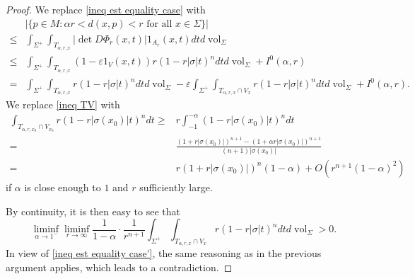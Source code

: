 \documentclass[11pt, reqno]{amsart}
\numberwithin{equation}{section}
\begin{document}
\begin{proof}
We replace \eqref{ineq est equality case} with
\begin{equation}\label{ineq est equality case'}
\begin{aligned}
& | \{p \in M: \alpha r<d(x, p)<r \text { for all } x \in \Sigma\} | \\
\le & \int_{\Sigma^{+}} \int_{T_{\alpha, r, x}} \left|\det D \Phi_r(x, t)\right| 1_{A_r}(x, t) d t d \operatorname{vol}_{\Sigma} \\
\le & \int_{\Sigma^{+}} \int_{T_{\alpha, r, x}} \left(1-\varepsilon 1_V(x, t)\right) r(1-r|\sigma| t)^n d t d \operatorname{vol}_{\Sigma}+I^0(\alpha, r)\\
=& \int_{\Sigma^{+}} \int_{T_{\alpha, r, x}} r(1-r|\sigma| t)^n d t d \operatorname{vol}_{\Sigma}
-\varepsilon\int_{\Sigma^{+}} \int_{T_{\alpha, r, x}\cap V_x} r(1-r|\sigma| t)^n d t d \operatorname{vol}_{\Sigma}
+I^0(\alpha, r).
\end{aligned}
\end{equation}
We replace \eqref{ineq TV} with
\begin{equation*}
\begin{aligned}
\int_{T_{\alpha, r, x_0 }\cap V_{x_0}}r \left(1-r\left|\sigma\left(x_0\right)\right| t\right)^n d t
\ge& r \int_{-1}^{-\alpha}\left(1-r\left|\sigma\left(x_0\right)\right| t\right)^n d t\\
=& \frac{\left(1+r\left|\sigma\left(x_0\right)\right|\right)^{n+1}-\left(1+\alpha r\left|\sigma\left(x_0\right)\right|\right)^{n+1}}{(n+1)\left|\sigma\left(x_0\right)\right|}\\
=& {r\left(1+r\left|\sigma\left(x_0\right)\right|\right)^n}(1-\alpha)+O(r^{n+1}(1-\alpha)^2)
\end{aligned}
\end{equation*}
if $\alpha$ is close enough to $1$ and $r$ sufficiently large.

By continuity, it is then easy to see that
$$
\liminf_{\alpha \rightarrow 1^{-}} \liminf_{r \rightarrow \infty} \frac{1}{1-\alpha} \cdot \frac{1}{r^{n+1}}\int_{\Sigma^{+}} \int_{T_{\alpha, r, x}\cap V_x} r(1-r|\sigma| t)^n d t d \operatorname{vol}_{\Sigma}>0.
$$
In view of \eqref{ineq est equality case'}, the same reasoning as in the previous argument applies, which leads to a contradiction.
\end{proof}
\end{document}
